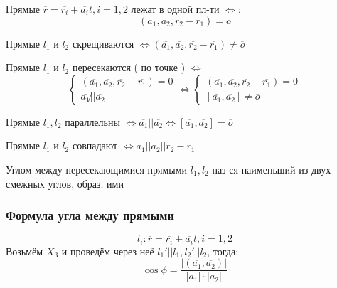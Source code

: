  \begin{consequence}
 Прямые $\overline{r} = \overline{r_i} + \overline{a_i}t, i = 1,2$ лежат в одной пл-ти $\iff$:
 \[
   (\overline{a_1}, \overline{a_2}, \overline{r_2} - \overline{r_1}) = \overline{o}
 \]
 \end{consequence}
 \begin{consequence}
 Прямые $l_1$ и $l_2$ скрещиваются $\iff (\overline{a_1}, \overline{a_2}, \overline{r_2} - \overline{r_1}) \neq \overline{o}$
 \end{consequence}
 \begin{consequence}
 Прямые $l_1$ и $l_2$ пересекаются ( по точке ) $\iff$
 \[
 \begin{cases}
   (\overline{a_1}, \overline{a_2}, \overline{r_2} - \overline{r_1}) = 0 \\
   \overline{a_1} \not|| \overline{a_2}
 \end{cases} \iff
 \begin{cases}
   (\overline{a_1}, \overline{a_2}, \overline{r_2} - \overline{r_1}) = 0 \\
   [\overline{a_1}, \overline{a_2}] \neq \overline{o}
 \end{cases}
 \]
 \end{consequence}
 \begin{consequence}
 Прямые $l_1, l_2$ параллельны $\iff \overline{a_1} || \overline{a_2} \iff [\overline{a_1}, \overline{a_2}] = \overline{o}$ 
 \end{consequence}
 \begin{consequence}
 Прямые $l_1$ и $l_2$ совпадают $\iff \overline{a_1} || \overline{a_2} || \overline{r_2} - \overline{r_1}$
 \end{consequence}
 \begin{definition}
 Углом между пересекающимися прямыми $l_1, l_2$ наз-ся наименьший из двух смежных углов, образ. ими 
 \end{definition}
\subsubsection{Формула угла между прямыми}
\[
  l_i\colon \overline{r} = \overline{r_i} + \overline{a_i}t, i = 1, 2
\]
Возьмём $X_3$ и проведём через неё $l_1' || l_1, l_2' || l_2$, тогда:
\[
\cos \phi = \frac{|(\overline{a_1}, \overline{a_2})|}{\left|\overline{a_1}\right| \cdot \left|\overline{a_2}\right|}
\]
